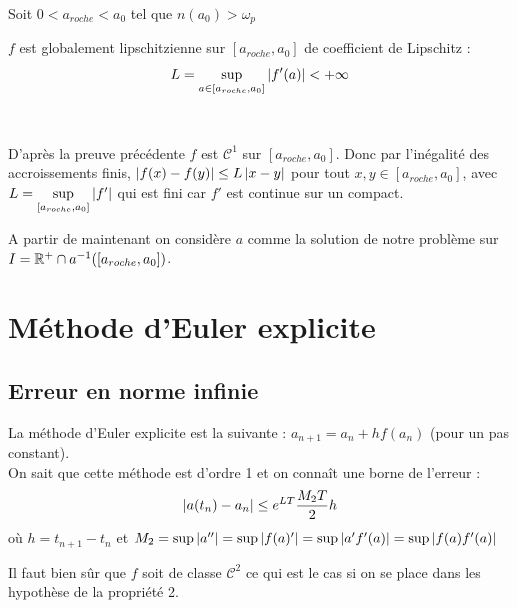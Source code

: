 \documentclass[12pt,a4paper]{article}
\begin{document}
	\begin{prop} Soit $0< a_{roche} < a_0$ tel que $n(a_0) > \omega_p$\\
		
		\begin{minipage}{18.5cm}
			$f$ est globalement lipschitzienne sur $[a_{roche},a_0]$ de coefficient de Lipschitz :
			\[L = \underset{a \in [a_{roche},a_0]}\sup\left\lvert f'(a) \right\rvert<+\infty\]
		\end{minipage}
		
		\vspace{-.5cm}
		
	\end{prop}
	\begin{dem}$ $
		
		\vspace{.2cm}
		
		\begin{minipage}{17.5cm}
			D'après la preuve précédente $f$ est $\mathcal C^1$ sur $[a_{roche},a_0]$. Donc par l'inégalité des accroissements finis, $\left\lvert f(x)-f(y) \right\rvert \leq L\left\lvert x-y \right\rvert$ pour tout $x,y \in [a_{roche},a_0]$, avec $L = \underset{[a_{roche},a_0]}\sup\left\lvert f' \right\rvert$ qui est fini car $f'$ est continue sur un compact.
		\end{minipage}
	\end{dem}
	
	A partir de maintenant on considère $a$ comme la solution de notre problème sur $I = \mathbb{R}^+\cap a^{-1}([a_{roche},a_0])$.
	
	\section{Méthode d'Euler explicite}
	
	\subsection{Erreur en norme infinie}
	
	La méthode d'Euler explicite est la suivante : $a_{n+1} = a_n + hf(a_n)$ (pour un pas constant).\\
	On sait que cette méthode est d'ordre 1 et on connaît une borne de l'erreur :
	\[
	\left\lvert a(t_n)-a_n \right\rvert \leq e^{LT}\frac{M_2T}{2}h
	\]
	où $h = t_{n+1} - t_n$ et $M_2 = \sup \left\lvert a'' \right\rvert = \sup\left\lvert f(a)' \right\rvert = \sup\left\lvert a'f'(a) \right\rvert = \sup\left\lvert f(a)f'(a) \right\rvert$
	
	\noindent Il faut bien sûr que $f$ soit de classe $\mathcal C^2$ ce qui est le cas si on se place dans les hypothèse de la propriété 2.
	
\end{document}
